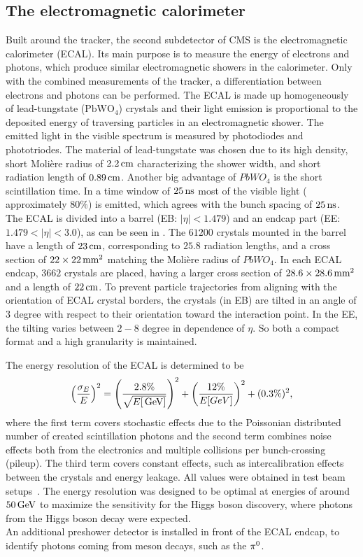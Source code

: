 \subsection{The electromagnetic calorimeter}
Built around the tracker, the second subdetector of CMS is the electromagnetic calorimeter (ECAL). Its main purpose is to measure the energy of electrons and photons, which produce similar electromagnetic showers in the calorimeter. Only with the combined measurements of the tracker, a differentiation between electrons and photons can be performed. The ECAL is made up homogeneously of lead-tungstate ($\mathrm{PbWO_4}$) crystals and their light emission is proportional to the deposited energy of traversing particles in an electromagnetic shower. The emitted light in the visible spectrum is measured by photodiodes and phototriodes. The material of lead-tungstate was chosen due to its high density, short Moli\`{e}re radius of $2.2\,\text{cm}$ characterizing the shower width, and short radiation length of $0.89\,\text{cm}$. Another big advantage of $PbWO_4$ is the short scintillation time. In a time window of $25\,\text{ns}$ most of the visible light ( approximately $80\%$) is emitted, which agrees with the bunch spacing of $25\,\text{ns}$. The ECAL is divided into a barrel (EB: $|\eta|<1.479$) and an endcap part (EE: $1.479<|\eta|<3.0$), as can be seen in . The $61200$ crystals mounted in the barrel have a length of $23\,\text{cm}$, corresponding to $25.8$ radiation lengths, and a cross section of $22\times22\,\text{mm}^2$ matching the Moli\`{e}re radius of $PbWO_4$. In each ECAL endcap, $3662$ crystals are placed, having a larger cross section of $ 28.6\times28.6\,\text{mm}^2$ and a length of $22\,\text{cm}$.
To prevent particle trajectories from aligning with the orientation of ECAL crystal borders, the crystals (in EB) are tilted in an angle of $3$ degree with respect to their orientation toward the interaction point. In the EE, the tilting varies between $2-8$ degree in dependence of $\eta$. So both a compact format and a high granularity is maintained.

The energy resolution of the ECAL is determined to be
\begin{equation}
 \left(\frac{\sigma_E}{E}\right)^2=\left(\frac{2.8\%}{\sqrt{E[\,\text{Ge\hspace{-.08em}V}]}}\right)^2 + \left(\frac{12\%}{E[GeV]}\right)^2 + (0.3\%)^2,
\end{equation}
where the first term covers stochastic effects due to the Poissonian distributed number of created scintillation photons and the second term combines noise effects both from the electronics and multiple collisions per bunch-crossing (pileup). The third term covers constant effects, such as intercalibration effects between the crystals and energy leakage. All values were obtained in test beam setups~\cite{ECALRes}. The energy resolution was designed to be optimal at energies of around $50\,\text{Ge\hspace{-.08em}V}$ to maximize the sensitivity for the Higgs boson discovery, where photons from the Higgs boson decay were expected.\\
An additional preshower detector is installed in front of the ECAL endcap, to identify photons coming from meson decays, such as the $\pi^0$.

